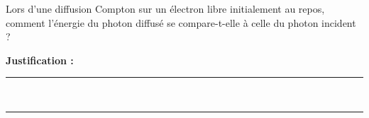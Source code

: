Lors d'une diffusion Compton sur un électron libre initialement au repos, comment l'énergie du photon diffusé se compare-t-elle à celle du photon incident ?

\choices

\noindent\textbf{Justification :} \hrulefill \\[2.5ex]
\rule{\linewidth}{0.4pt} \\[2.5ex]
\rule{\linewidth}{0.4pt}
\vfill
